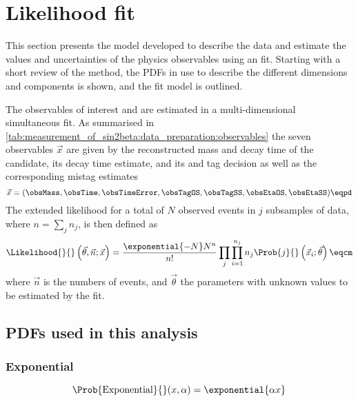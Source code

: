 
\section{Likelihood fit}
\label{sec:measurement_of_sin2beta:likelihood_fit}

This section presents the model developed to describe the data and estimate the
values and uncertainties of the physics observables using an \uEML fit. Starting
with a short review of the \uEML method, the \acp{PDF} in use to describe the
different dimensions and components is shown, and the fit model is outlined.

The \CP observables of interest \SJpsiKS and \CJpsiKS are estimated in a
multi-dimensional simultaneous \uEML fit. As summarised in
\cref{tab:measurement_of_sin2beta:data_preparation:observables} the seven
observables $\vec{x}$ are given by the reconstructed mass and decay time of the
\Bd candidate, its decay time estimate, and its \OS and \SSpi tag decision as
well as the corresponding mistag estimates
%
\begin{equation}\label{eq:measurement_of_sin2beta:likelihood_fit:observables}
  \vec{x} = (\obsMass, \obsTime, \obsTimeError, \obsTagOS, \obsTagSS, \obsEtaOS, \obsEtaSS)\eqpd  
\end{equation}
%
The extended likelihood for a total of $N$ observed events in $j$ subsamples of
data, where $n=\sum_j n_j$, is then defined as
%
\begin{equation}\label{sec:measurement_of_sin2beta:likelihood_fit:uEML}
  \Likelihood{}{}\left(\vec{\theta},\vec{n};\vec{x}\right) = \frac{\exponential{-N} N^n}{n!} \prod_j \prod_{i=1}^{n_j} n_j \Prob{j}{}\left(\vec{x}_i;\vec{\theta}\right)\eqcm
\end{equation}
%
where $\vec{n}$ is the numbers of events, and $\vec{\theta}$ the parameters with
unknown values to be estimated by the \uEML fit. 

\subsection{\acp{PDF} used in this analysis}
\label{sec:measurement_of_sin2beta:likelihood_fit:pdfs}

\subsubsection{Exponential}
\begin{equation}\label{sec:measurement_of_sin2beta:likelihood_fit:pdfs:exponential}
  \Prob{\text{Exponential}}{}(x, \alpha) = \exponential{\alpha x}
\end{equation}

